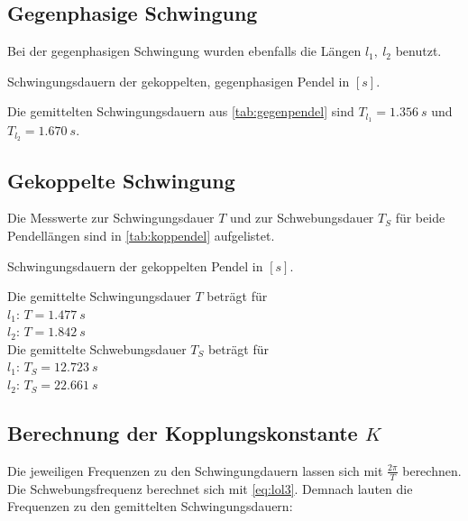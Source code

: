 \subsection{Gegenphasige Schwingung}
Bei der gegenphasigen Schwingung wurden ebenfalls die Längen $l_1, \ l_2$ benutzt.

\begin{table}
  \centering
  \caption{Schwingungsdauern der gekoppelten, gegenphasigen Pendel in $[s]$.}
  \label{tab:gegenpendel}
\end{table}

Die gemittelten Schwingungsdauern aus \autoref{tab:gegenpendel} sind $T_{l_1} = 1.356\ s$ und $T_{l_2} = 1.670\ s$.

\subsection{Gekoppelte Schwingung}
Die Messwerte zur Schwingungsdauer $T$ und zur Schwebungsdauer $T_S$ für beide Pendellängen sind in \autoref{tab:koppendel} aufgelistet.
\newpage
\begin{table}
  \centering
  \caption{Schwingungsdauern der gekoppelten Pendel in $[s]$.}
  \label{tab:koppendel}
\end{table}

Die gemittelte Schwingungsdauer $T$ beträgt für\\ $l_1$: $T = 1.477\ s$\\ $l_2$: $T = 1.842\ s$\\
Die gemittelte Schwebungsdauer $T_S$ beträgt für\\ $l_1$: $T_S = 12.723\ s$\\ $l_2$: $T_S = 22.661\ s$

\subsection{Berechnung der Kopplungskonstante $K$}
\label{sec:ksec}
Die jeweiligen Frequenzen zu den Schwingungdauern lassen sich mit $\frac{2\pi}{T}$ berechnen.\\
Die Schwebungsfrequenz berechnet sich mit \autoref{eq:lol3}.
Demnach lauten die Frequenzen zu den gemittelten Schwingungsdauern:

